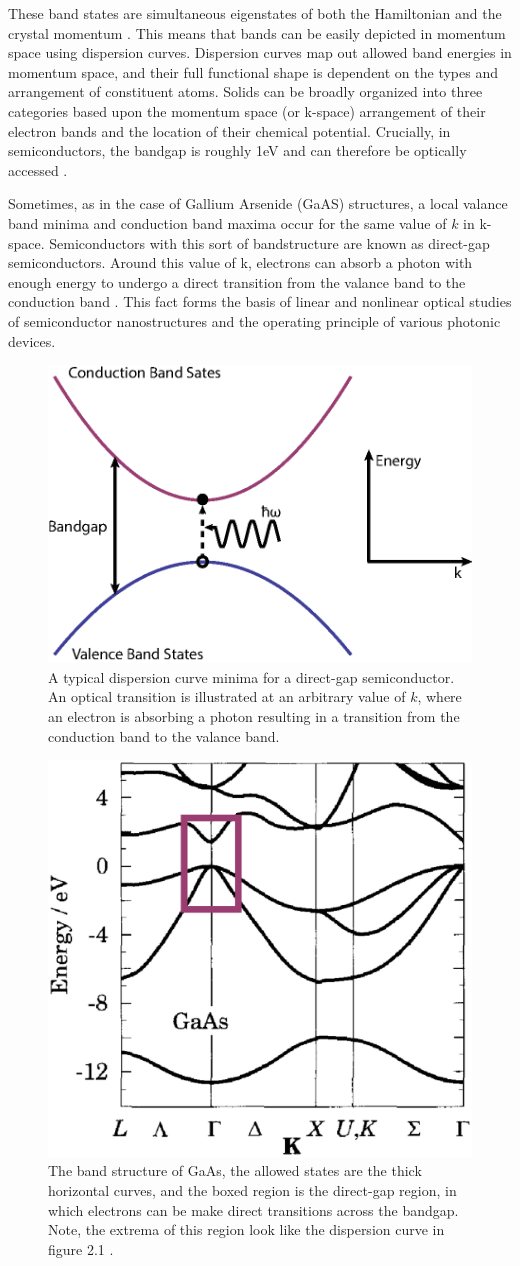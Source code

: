 \indent These band states are simultaneous eigenstates of both the Hamiltonian and the crystal momentum \cite{davies, fox}. This means that bands can be easily depicted in momentum space using dispersion curves. Dispersion curves map out allowed band energies in momentum space, and their full functional shape is dependent on the types and arrangement of constituent atoms.  Solids can be broadly organized into three categories based upon the momentum space (or k-space) arrangement of their electron bands and the location of their chemical potential. Crucially, in semiconductors, the bandgap is roughly 1eV and can therefore be optically accessed \cite{fox}. 

\indent Sometimes, as in the case of Gallium Arsenide (GaAS) structures, a local valance band minima and conduction band maxima occur for the same value of $k$ in k-space. Semiconductors with this sort of bandstructure are known as direct-gap semiconductors. Around this value of k, electrons can absorb a photon with enough energy to undergo a direct transition from the valance band to the conduction band \cite{iadonisi, galanthesis}. This fact forms the basis of linear and nonlinear optical studies of semiconductor nanostructures \cite{stevereview} and the operating principle of various photonic devices.

\begin{figure}[h]
\centering
\includegraphics[width = .4\textwidth]{dispcurve.eps}
\caption{ \doublespacing A typical dispersion curve minima for a direct-gap semiconductor. An optical transition is illustrated at an arbitrary value of $k$, where an electron is absorbing a photon resulting in a transition from the conduction band to the valance band.}
\label{ExampleBands}
\end{figure}

\begin{figure}[h!]
\centering
\includegraphics[width = .3\textwidth]{GaAsBstruct.eps}
\caption{\doublespacing The band structure of GaAs, the allowed states are the thick horizontal curves, and the boxed region is the direct-gap region, in which electrons can be make direct transitions across the bandgap. Note, the extrema of this region look like the dispersion curve in figure 2.1 \cite{davies}.}
\label{GaAsBstruct}
\end{figure}


